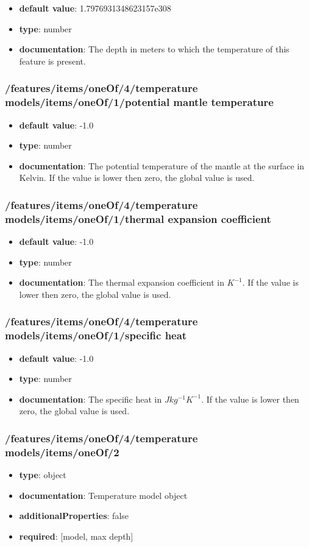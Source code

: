 \begin{itemize}\item {\bf default value}: 1.7976931348623157e308
\item {\bf type}: number
\item {\bf documentation}: The depth in meters to which the temperature of this feature is present.
\end{itemize}\subsubsection{/features/items/oneOf/4/temperature models/items/oneOf/1/potential mantle temperature}
\begin{itemize}\item {\bf default value}: -1.0
\item {\bf type}: number
\item {\bf documentation}: The potential temperature of the mantle at the surface in Kelvin. If the value is lower then zero, the global value is used.
\end{itemize}\subsubsection{/features/items/oneOf/4/temperature models/items/oneOf/1/thermal expansion coefficient}
\begin{itemize}\item {\bf default value}: -1.0
\item {\bf type}: number
\item {\bf documentation}: The thermal expansion coefficient in $K^{-1}$. If the value is lower then zero, the global value is used.
\end{itemize}\subsubsection{/features/items/oneOf/4/temperature models/items/oneOf/1/specific heat}
\begin{itemize}\item {\bf default value}: -1.0
\item {\bf type}: number
\item {\bf documentation}: The specific heat in $J kg^{-1} K^{-1}$. If the value is lower then zero, the global value is used.
\end{itemize}\subsubsection{/features/items/oneOf/4/temperature models/items/oneOf/2}
\begin{itemize}\item {\bf type}: object
\item {\bf documentation}: Temperature model object
\item {\bf additionalProperties}: false
\item {\bf required}: [model, max depth]\end{itemize}
